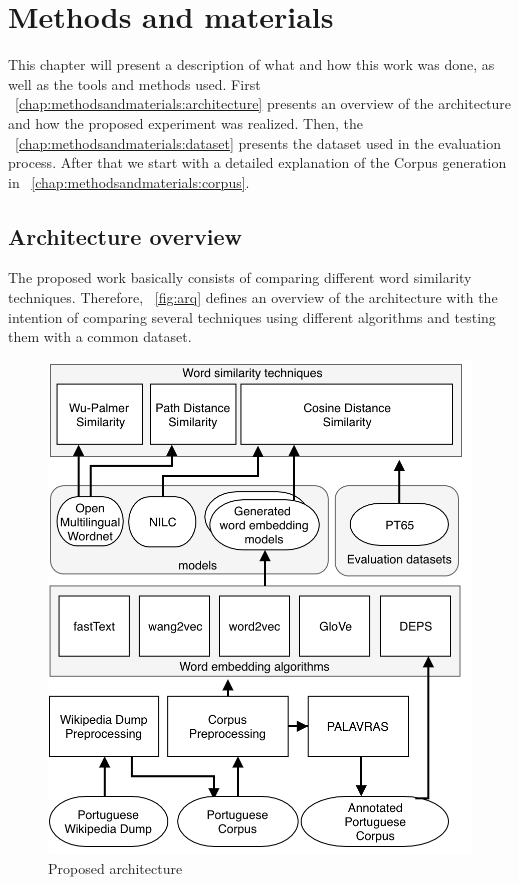 \section{Methods and materials}\label{chap:methodsandmaterials}

This chapter will present a description of what and how this work was done, as well as the tools and methods used. First ~\autoref{chap:methodsandmaterials:architecture} presents an overview of the architecture and how the proposed experiment was realized. Then, the ~\autoref{chap:methodsandmaterials:dataset} presents the dataset used in the evaluation process. After that we start with a detailed explanation of the Corpus generation in ~\autoref{chap:methodsandmaterials:corpus}.

\subsection{Architecture overview}\label{chap:methodsandmaterials:architecture}

The proposed work basically consists of comparing different word similarity techniques. Therefore, ~\autoref{fig:arq} defines an overview of the architecture with the intention of comparing several techniques using different algorithms and testing them with a common dataset.

\begin{figure}[h]
	\caption{Proposed architecture}
	\label{fig:arq}
	\centering%
	\begin{minipage}{.8\textwidth}
		\includegraphics[width=\textwidth]{arq.png}
	\end{minipage}
\end{figure}


